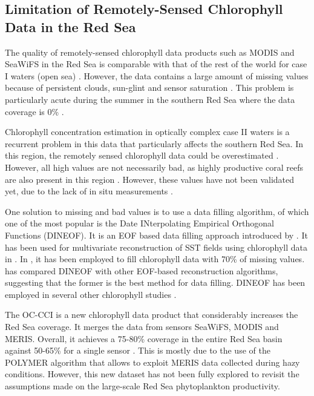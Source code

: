 \subsection{Limitation of Remotely-Sensed Chlorophyll Data in the Red Sea}

The quality of remotely-sensed chlorophyll data products such as MODIS and 
SeaWiFS in the Red Sea is comparable with that of the rest of the world for case 
I waters (open sea) \citep{Brewin2013}. However, the data contains a large 
amount of missing values because of persistent clouds, sun-glint and sensor 
saturation \citep{Racault}. This problem is particularly acute during the summer 
in the southern Red Sea where the data coverage is 0\% \citep{Racault}.

Chlorophyll concentration estimation in optically complex case II waters is a 
recurrent problem in this data that particularly affects the southern Red Sea. 
In this region, the remotely sensed chlorophyll data could be overestimated 
\citep{Raitsos2013}. However, all high values are not necessarily bad, as highly 
productive coral reefs are also present in this region \citep{Raitsos2013}. 
However, these values have not been validated yet, due to the lack of in situ 
measurements \citep{Raitsos2013}.

One solution to missing and bad values is to use a data filling algorithm, of 
which one of the most popular is the Date INterpolating Empirical Orthogonal 
Functions (DINEOF). It is an EOF based data filling approach introduced by 
\citet{Beckers2003}. It has been used for multivariate reconstruction of SST 
fields using chlorophyll data in \citet{Alvera2007}. In \citet{Sicarjobs2011}, 
it has been employed to fill chlorophyll data with 70\% of missing values. 
\citet{Taylor2013} has compared DINEOF with other EOF-based reconstruction 
algorithms, suggesting that the former is the best method for data filling. 
DINEOF has been employed in several other chlorophyll studies \citep{Miles2010, 
Waite2013}.

The OC-CCI is a new chlorophyll data product that considerably increases the Red 
Sea coverage. It merges the data from sensors SeaWiFS, MODIS and MERIS. Overall, 
it achieves a 75-80\% coverage in the entire Red Sea basin against 50-65\% for a 
single sensor \citep{Racault}. This is mostly due to the use of the POLYMER 
algorithm \citep{Steinmetz2011} that allows to exploit MERIS data collected 
during hazy conditions. However, this new dataset has not been fully explored to 
revisit the assumptions made on the large-scale Red Sea phytoplankton 
productivity.


